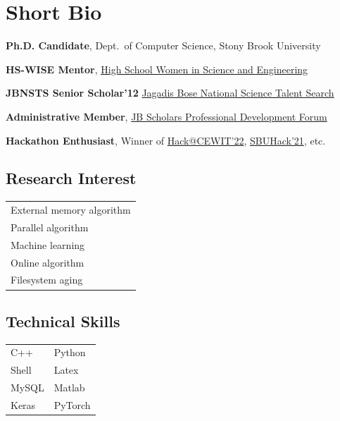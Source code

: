 \documentclass[letterpaper,10pt]{article}
\begin{document}
\begin{minipage}{0.65\textwidth}
\section{Short Bio}
\resumeSubHeadingListStart
\item \textbf{Ph.D. Candidate}, Dept.\ of Computer Science, Stony Brook University
\item \textbf{HS-WISE Mentor}, \href{https://www.stonybrook.edu/commcms/wise/pre-college/high_school.php}{High School Women in Science and Engineering}
\item \textbf{JBNSTS Senior Scholar'12} \href{https://jbnsts.ac.in}{Jagadis Bose National Science Talent Search}
\item \textbf{Administrative Member}, \href{https://sites.google.com/view/jbspdf/home}{JB Scholars Professional Development Forum}
\item \textbf{Hackathon Enthusiast}, Winner of \href{https://devpost.com/software/cryptopiens}{Hack@CEWIT'22}, \href{https://devpost.com/software/steganography-attack}{SBUHack'21}, etc.
\resumeSubHeadingListEnd
\end{minipage}
\begin{minipage}{0.2\textwidth}
\end{minipage}
\begin{minipage}{0.25\textwidth}
\subsection*{Research Interest}
\begin{center}
\begin{tabular*}{\textwidth}{ m{5cm} }
\rowcolor{Gray} External memory algorithm \\
\rowcolor{Gray} Parallel algorithm \\
\rowcolor{Gray} Machine learning \\
\rowcolor{Gray} Online algorithm \\
\rowcolor{Gray} Filesystem aging \\
\end{tabular*}
\end{center}
\subsection*{Technical Skills}
\begin{center}
\begin{tabular*}{\textwidth}{ m{3cm} m{2cm} }
\rowcolor{Gray} C++ & Python \\
\rowcolor{Gray} Shell & Latex \\
\rowcolor{Gray} MySQL & Matlab \\
\rowcolor{Gray} Keras & PyTorch \\
\end{tabular*}
\end{center}
\end{minipage}
\end{document}

